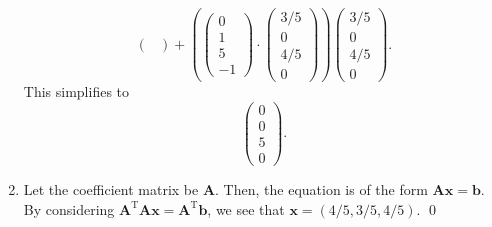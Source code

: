 \documentclass[12pt]{article}
\begin{document}
\begin{enumerate}[label=\textbf{(\alph*)}]
\[\begin{pmatrix}
    \end{pmatrix}+\left(\begin{pmatrix}
        0\\1\\5\\-1
    \end{pmatrix}\cdot \begin{pmatrix}
        3/5 \\ 0 \\ 4/5 \\ 0
    \end{pmatrix}\right)\begin{pmatrix}
        3/5 \\ 0 \\ 4/5 \\0
    \end{pmatrix}.\]
    This simplifies to \[\begin{pmatrix}
        0\\0\\5\\0
    \end{pmatrix}.\]
\item Let the coefficient matrix be $\mathbf{A}$. Then, the equation is of the form $\mathbf{Ax}=\mathbf{b}$. By considering $\mathbf{A}^\text{T}\mathbf{Ax}=\mathbf{A}^\text{T}\mathbf{b}$, we see that $\mathbf{x}=\left(4/5,3/5,4/5\right)$. \qed 
\end{enumerate}
\end{document}
